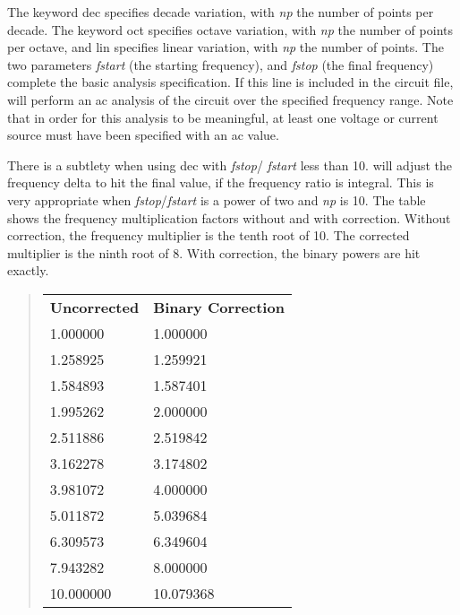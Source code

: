 
The keyword {\vt dec} specifies decade variation, with {\it np\/} the
number of points per decade.  The keyword {\vt oct} specifies octave
variation, with {\it np\/} the number of points per octave, and {\vt
lin} specifies linear variation, with {\it np\/} the number of points. 
The two parameters {\it fstart\/} (the starting frequency), and {\it
fstop\/} (the final frequency) complete the basic analysis
specification.  If this line is included in the circuit file,
{\WRspice} will perform an ac analysis of the circuit over the
specified frequency range.  Note that in order for this analysis to be
meaningful, at least one voltage or current source must have been
specified with an {\vt ac} value.

There is a subtlety when using {\vt dec} with {\it fstop\/}/{\it
fstart} less than 10.  {\WRspice} will adjust the frequency delta to
hit the final value, if the frequency ratio is integral.  This is very
appropriate when {\it fstop\/}/{\it fstart} is a power of two and {\it
np} is 10.  The table shows the frequency multiplication factors
without and with correction.  Without correction, the frequency
multiplier is the tenth root of 10.  The corrected multiplier is the
ninth root of 8.  With correction, the binary powers are hit exactly.

\begin{quote}
\begin{tabular}{ll}
\bf Uncorrected & \bf Binary Correction\\
1.000000 & 1.000000\\
1.258925 & 1.259921\\
1.584893 & 1.587401\\
1.995262 & 2.000000\\
2.511886 & 2.519842\\
3.162278 & 3.174802\\
3.981072 & 4.000000\\
5.011872 & 5.039684\\
6.309573 & 6.349604\\
7.943282 & 8.000000\\
10.000000 & 10.079368\\
\end{tabular}
\end{quote}

